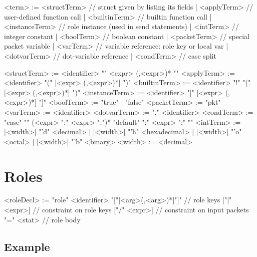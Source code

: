 \documentclass{report}
\begin{document}
\begin{bnflisting}{}
<term> := <structTerm>   // struct given by listing its fields
        | <applyTerm>    // user-defined function call
        | <builtinTerm>  // builtin function call
        | <instanceTerm> // role instance (used in send statements)
        | <intTerm>      // integer constant
        | <boolTerm>     // boolean constant
        | <packetTerm>   // special packet variable
        | <varTerm>      // variable reference: role key or local var
        | <dotvarTerm>   // dot-variable reference
        | <condTerm>     // case split
\end{bnflisting}

\begin{bnflisting}{}
<structTerm>   := <identifier> "{" <expr> (,<expr>)* "}"
<applyTerm>    := <identifier> "(" [<expr> (,<expr>)*] ")"
<builtinTerm>  := <identifier> "!" "(" [<expr> (,<expr>)*] ")"
<instanceTerm> := <identifier> "[" [<expr> (,<expr>)*] "]"
<boolTerm>     := "true" | "false"
<packetTerm>   := "pkt"
<varTerm>      := <identifier>
<dotvarTerm>   := "." <identifier>
<condTerm>     := "case" "{"
                  (<expr> ":" <expr> ";")*
                  "default" ":" <expr> ";"
                  "}"
<intTerm>      := [<width>] "'d" <decimal>
                | [<width>] "'h" <hexadecimal>
                | [<width>] "'o" <octal>
                | [<width>] "'b" <binary>
<width> := <decimal>
\end{bnflisting}

\section{Roles}

\begin{bnflisting}{}
<roleDecl> := "role" <identifier> 
              "["[<arg>(,<arg>)*]"]" // role keys
              ["|" <expr>]    // constraint on role keys
              ["/" <expr>]    // constraint on input packets
              "=" <stat>      // role body
\end{bnflisting}

\subsection*{Example}
\end{document}
